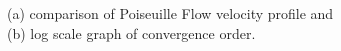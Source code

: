 \begin{frame}
\begin{center}
\begin{columns}[c]
\begin{column}{0.65\textwidth}
\begin{figure}
\end{figure}
\end{column}
\end{columns}
\vspace{0.06cm}
\centering \scriptsize (a) comparison of Poiseuille Flow velocity profile and\\ (b) log scale graph of convergence order.
\end{center}
\end{frame}

